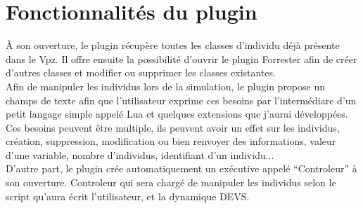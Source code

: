 \section{Fonctionnalités du plugin}
À son ouverture, le plugin récupère toutes les classes d'individu déjà présente dans le Vpz. Il offre ensuite la possibilité d'ouvrir le plugin Forrester afin de créer d'autres classes et modifier ou supprimer les classes existantes.\\
Afin de manipuler les individus lors de la simulation, le plugin propose un champs de texte afin que l'utilisateur exprime ces besoins par l'intermédiare d'un petit langage simple appelé Lua et quelques extensions que j'aurai développées.\\
Ces besoins peuvent être multiple, ils peuvent avoir un effet sur les individus, création, suppression, modification ou bien renvoyer des informations, valeur d'une variable, nombre d'individus, identifiant d'un individu...\\
D'autre part, le plugin crée automatiquement un exécutive appelé ``Controleur'' à son ouverture. Controleur qui sera chargé de manipuler les individus selon le script qu'aura écrit l'utilisateur, et la dynamique DEVS.\\